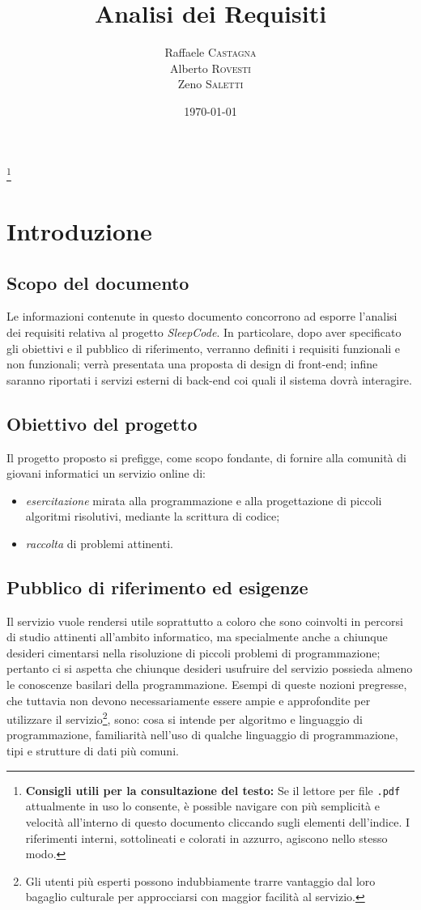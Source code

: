\documentclass[11pt, a4paper]{article}
\title{Analisi dei Requisiti}
\author{Raffaele \textsc{Castagna}\\
Alberto \textsc{Rovesti}\\
Zeno \textsc{Saletti}}
\date{\today}
\theoremstyle{definition}
\newcommand\blfootnote[1]{%
  \begingroup
  \renewcommand\thefootnote{}\footnote{#1}%
  \addtocounter{footnote}{-1}%
  \endgroup
}
\begin{document}


\tableofcontents\blfootnote{\textbf{Consigli utili per la consultazione del testo:} Se il lettore per file \texttt{.pdf} attualmente in uso lo consente, è possible navigare con più semplicità e velocità all'interno di questo documento cliccando sugli elementi dell'indice. I riferimenti interni, sottolineati e colorati in azzurro, agiscono nello stesso modo.}


\newpage
\section{Introduzione}
\subsection{Scopo del documento}
Le informazioni contenute in questo documento concorrono ad esporre l'analisi
dei requisiti relativa al progetto \textit{SleepCode}. In particolare, dopo
aver specificato gli obiettivi e il pubblico di riferimento, verranno definiti i requisiti
funzionali e non funzionali; verrà presentata una proposta di design di
front-end; infine saranno riportati i servizi esterni di back-end coi quali il
sistema dovrà interagire.


\subsection{Obiettivo del progetto}
Il progetto proposto si prefigge, come scopo fondante, di fornire alla comunità
di giovani informatici un servizio online di:
\begin{itemize}
    \item \textit{esercitazione} mirata alla programmazione e alla progettazione
    di piccoli algoritmi risolutivi, mediante la scrittura di codice;
    \item \textit{raccolta} di problemi attinenti.
\end{itemize}

\subsection{Pubblico di riferimento ed esigenze}
Il servizio vuole rendersi utile soprattutto a coloro che sono coinvolti
in percorsi di studio attinenti all'ambito informatico, ma specialmente anche
a chiunque desideri cimentarsi nella risoluzione di piccoli problemi di
programmazione; pertanto ci si aspetta che chiunque desideri usufruire del
servizio possieda almeno le conoscenze basilari della programmazione. Esempi
di queste nozioni pregresse, che tuttavia non devono necessariamente essere ampie e approfondite per utilizzare il servizio\footnote{Gli utenti più esperti possono indubbiamente trarre vantaggio dal loro bagaglio culturale per
approcciarsi con maggior facilità al servizio.}, sono: cosa si intende per
algoritmo e linguaggio di programmazione, familiarità nell'uso di qualche
linguaggio di programmazione, tipi e strutture di dati più comuni.
\end{document}
